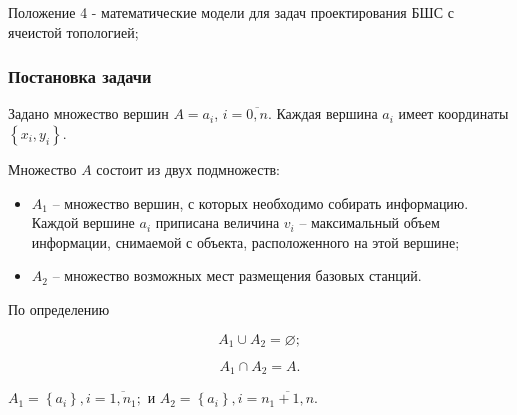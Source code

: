 \begin{frame}
    \begin{center}
        {Положение 4 - математические модели для задач проектирования БШС с ячеистой
        топологией;}
    \end{center}
\end{frame}



\begin{frame}
    \frametitle{Постановка задачи}
    \fontsize{8pt}{7.2}\selectfont
    \justifying
    Задано множество вершин $A = a_i$, $i=\overline{0,n}$. Каждая вершина $a_i$ имеет координаты $\left\{ x_i, y_i \right\}$.
    
    \begin{minipage}[c]{0.47\linewidth}
        \fontsize{8pt}{7.2}\selectfont
        \bigskip

        Множество $A$ состоит из двух подмножеств: 
        \begin{itemize}
        \item $A_1$ -- множество вершин, с которых необходимо собирать информацию. Каждой вершине $a_i$ приписана   величина $v_i$ -- максимальный объем информации, снимаемой с объекта, расположенного на этой вершине;
        \item $A_2$ -- множество возможных мест размещения базовых станций. 
        \end{itemize}

        По определению

        $$
        A_1 \cup A_2 = \varnothing;
        $$

        $$
        A_1 \cap A_2 = A.
        $$

        
    \end{minipage}
    \begin{minipage}[c]{0.47\linewidth}
    \end{minipage}
    
    \bigskip
    \bigskip

    $
    A_1 = \left\{a_i \right\}, i= \overline{1,n_1};
    $ и $
    A_2 = \left\{ a_i  \right\}, i= \overline{n_1+1,n}.
    $
    
\end{frame}

